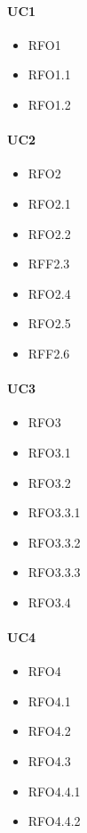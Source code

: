 \paragraph{UC1}
\quad
\begin{multicols}{3}
    \begin{itemize}
        \item RFO1
        \item RFO1.1
        \item RFO1.2
    \end{itemize}
\end{multicols}

\paragraph{UC2}
\quad
\begin{multicols}{3}
    \begin{itemize}
        \item RFO2
        \item RFO2.1
        \item RFO2.2
        \item RFF2.3
        \item RFO2.4
        \item RFO2.5
        \item RFF2.6
    \end{itemize}
\end{multicols}

\paragraph{UC3}
\quad
\begin{multicols}{3}
    \begin{itemize}
        \item RFO3
        \item RFO3.1
        \item RFO3.2
        \item RFO3.3.1
        \item RFO3.3.2
        \item RFO3.3.3
        \item RFO3.4
    \end{itemize}
\end{multicols}

\paragraph{UC4}
\quad
\begin{multicols}{3}
    \begin{itemize}
        \item RFO4
        \item RFO4.1
        \item RFO4.2
        \item RFO4.3
        \item RFO4.4.1
        \item RFO4.4.2
    \end{itemize}
\end{multicols}

